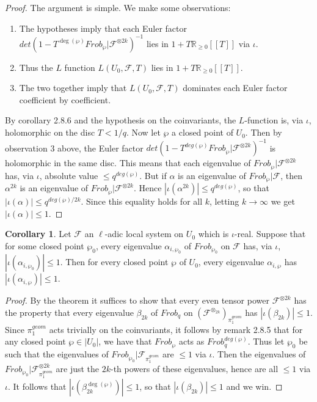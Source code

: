 \documentclass{ucbthesis}
\theoremstyle{definition}
\theoremstyle{theorem}
\newtheorem{cor}[thm]{Corollary}
\begin{document}
\begin{proof}
The argument is simple. We make some observations:
\begin{enumerate}
\item The hypotheses imply that each Euler factor $det(1-T^{\deg(\wp)}Frob_{\wp}|\mathcal{F}^{\otimes 2k})^{-1}$ lies in $1 + T\mathbb{R}_{\geq 0}[[T]]$ via $\iota$. 
\item Thus the $L$ function $L(U_{0},\mathcal{F},T)$ lies in $1 + T\mathbb{R}_{\geq 0}[[T]]$. 
\item The two together imply that $L(U_{0},\mathcal{F},T)$ dominates each Euler factor coefficient by coefficient.
\end{enumerate}
By corollary 2.8.6 and the hypothesis on the coinvariants, the $L$-function is, via
 $\iota$, holomorphic on the disc $T < 1/q$. Now let $\wp$ a closed point of $U_{0}$. Then by observation 3
  above, the Euler factor $det(1-T^{deg(\wp)}Frob_{\wp}|\mathcal{F}^{\otimes 2k})^{-1}$ is holomorphic in the
   same disc. This means that each eigenvalue of $Frob_{\wp}|\mathcal{F}^{\otimes 2k}$ has, via $\iota$,
    absolute value $\leq q^{deg(\wp)}$. But if $\alpha$ is an eigenvalue of $Frob_{\wp}|\mathcal{F}$, then
     $\alpha^{2k}$ is an eigenvalue of $Frob_{\wp}|\mathcal{F}^{\otimes 2k}$. Hence $|\iota(\alpha^{2k})|\leq
      q^{deg(\wp)}$, so that $|\iota(\alpha)|\leq q^{deg(\wp)/2k}$. Since this equality holds for all $k$,
       letting $k\rightarrow \infty$ we get $|\iota(\alpha)|\leq 1$.
\end{proof}

\begin{cor}
Let $\mathcal{F}$ an $\ell$-adic local system on $U_{0}$ which is $\iota$-real. Suppose that for some closed point $\wp_{0}$, every eigenvalue $\alpha_{i,\wp_{0}}$ of $Frob_{\wp_{0}}$ on $\mathcal{F}$ has, via $\iota$, $|\iota(\alpha_{i,\wp_{0}})| \leq 1$. Then for every closed point $\wp$ of $U_{0}$, every eigenvalue $\alpha_{i,\wp}$ has $|\iota(\alpha_{i,\wp})| \leq 1$. 
\end{cor}
\begin{proof}
By the theorem it suffices to show that every even tensor power $\mathcal{F}^{\otimes 2k}$ has the property
 that every eigenvalue $\beta_{2k}$ of $Frob_{q}$ on $(\mathcal{F}^{\otimes_{2k}})_{\pi_{1}^{geom}}$ has
  $|\iota(\beta_{2k})|\leq 1$. Since $\pi_{1}^{geom}$ acts trivially on the coinvariants, it follows by
   remark 2.8.5 that for any closed point $\wp \in |U_{0}|$, we have that $Frob_{\wp}$ acts as
    $Frob_{q}^{deg(\wp)}$. Thus let $\wp_{0}$ be such that the eigenvalues of $Frob_{\wp_{0}}|
    \mathcal{F}_{\pi_{1}^{geom}}$ are $\leq 1$ via $\iota$. Then the eigenvalues of  $Frob_{\wp_{0}}|
    \mathcal{F}^{\otimes 2k}_{\pi_{1}^{geom}}$ are just the $2k$-th powers of these eigenvalues, hence are 
    all $\leq 1$ via $\iota$. It follows that $|\iota(\beta_{2k}^{\deg(\wp)})| \leq 1$, so that $|\iota(\beta_{2k})| \leq 1$ and we win. 
\end{proof}
\end{document}
